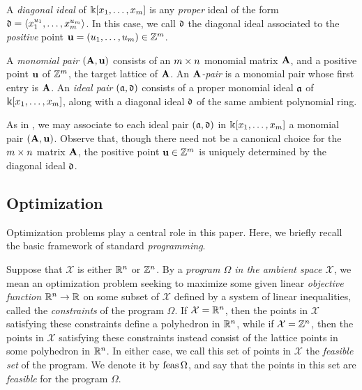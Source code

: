 \documentclass{amsart}
\begin{document}
\begin{definition}
   A  \emph{diagonal ideal} of $\Bbbk[x_1, \ldots, x_{m}]$ is any \emph{proper} ideal of the form $\mathfrak{d} = \langle x_1^{u_1}, \ldots, x_{m}^{u_{m}} \rangle$.
   In this case,  we call $\mathfrak{d}$ the diagonal ideal associated to the \emph{positive} point $\mathbf{u} = (u_1, \ldots, u_{m}) \in \mathbb{Z}^{m}$.
\end{definition}

\begin{definition}[Pairs]
\label{pairs: D}
   A \emph{monomial pair} $(\mathbf{A}, \mathbf{u})$ consists of an $m \times n$ monomial matrix $\mathbf{A}$, and a positive point $\mathbf{u}$ of $\mathbb{Z}^m$, the target lattice of $\mathbf{A}$.
    An \emph{$\mathbf{A}$-pair} is a monomial pair whose first entry is $\mathbf{A}$.
   An \emph{ideal pair} $(\mathfrak{a}, \mathfrak{d})$ consists of a proper monomial ideal $\mathfrak{a}$ of $\Bbbk[x_1, \ldots, x_{m}]$, along with a diagonal ideal $\mathfrak{d}$ of the same ambient polynomial ring.
\end{definition}

\begin{remark}
\label{associate of pairs: R}
 As in , we may associate to each ideal pair $(\mathfrak{a}, \mathfrak{d})$ in $\Bbbk[x_1, \ldots, x_{m}]$ a monomial pair $(\mathbf{A}, \mathbf{u})$.  Observe that, though there need not be a canonical choice for the $m \times n$ matrix $\mathbf{A}$, the positive point $\mathbf{u} \in \mathbb{Z}^m$ is uniquely determined by the diagonal ideal $\mathfrak{d}$.
\end{remark}

\subsection{Optimization} \label{optimization: S}  Optimization problems play a central role in this paper.  Here, we briefly recall the basic framework of standard \emph{programming}.

Suppose that $\mathcal{X}$ is either $\mathbb{R}^n$ or $\mathbb{Z}^n$.  By a \emph{program $\Omega$ in the ambient space $\mathcal{X}$}, we mean an optimization problem seeking to maximize some given linear \emph{objective function} $\mathbb{R}^n \to \mathbb{R}$ on some subset of $\mathcal{X}$ defined by a system of linear inequalities, called the \emph{constraints} of the program $\Omega$. If $\mathcal{X} = \mathbb{R}^n$, then the points in $\mathcal{X}$ satisfying these constraints define a polyhedron in $\mathbb{R}^n$, while if $\mathcal{X} = \mathbb{Z}^n$, then the points in $\mathcal{X}$ satisfying these constraints instead consist of the lattice points in some polyhedron in $\mathbb{R}^n$.  In either case, we call this set of points in $\mathcal{X}$ the \emph{feasible set} of the program.  We denote it by $\operatorname{feas} \Omega$, and say that the points in this set are \emph{feasible} for the program $\Omega$.
\end{document}
